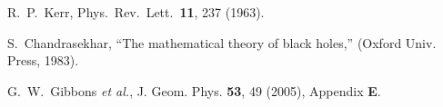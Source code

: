\documentclass[preprint,aps,tightenlines,showkeys,nofootinbib,superscriptaddress]{revtex4}
\begin{document}
\begin{thebibliography}{999}

  R.~P.~Kerr,
  Phys.\ Rev.\ Lett.\  {\bf 11}, 237 (1963).

  S.~Chandrasekhar,
  ``The mathematical theory of black holes,'' (Oxford Univ.
  Press, 1983).


  G.~W.~Gibbons \textit{et al.},
  J. Geom. Phys. \textbf{53}, 49
  (2005), Appendix {\bf E}.

\end{thebibliography}
\end{document}
